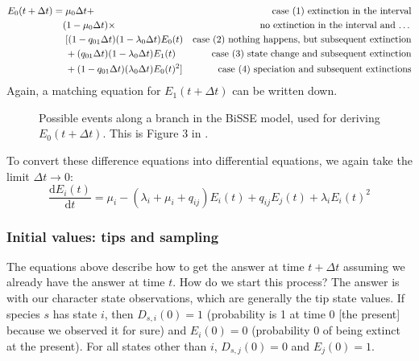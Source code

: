 \begin{align*}
    E_0(t + \Delta t) = &\; \mu_0\Delta t + 
	                 & \text{case (1) extinction in the interval} \\
				     & (1 - \mu_0\Delta t) \times & \text{no extinction in the interval and \dots} \\
				     & \;[(1-q_{01}\Delta t)(1-\lambda_0 \Delta t) E_0(t) & \text{case (2) nothing happens, but subsequent extinction} \\
                     & \;+ (q_{01}\Delta t) (1-\lambda_0 \Delta t) E_1(t) & \text{case (3) state change and subsequent extinction} \\
                     & \;+ (1 - q_{01} \Delta t) (\lambda_0 \Delta t) E_0(t)^2] & \text{case (4) speciation and subsequent extinctions}
\end{align*}
Again, a matching equation for $E_1(t+\Delta t)$ can be written down.

\begin{figure}
\centering
{}
\caption{\small
    Possible events along a branch in the BiSSE model, used for deriving $E_0(t + \Delta t)$.
    This is Figure 3 in \citet{Maddison2007}.
}
\label{fig:BiSSE_Events_E}
\end{figure}

To convert these difference equations into differential equations, we again take the limit $\Delta t \rightarrow 0$:
\begin{equation}
    \frac{\mathrm{d}E_i(t)}{\mathrm{d}t} = \mu_i - \left(\lambda_i + \mu_i + q_{ij} \right)E_i(t) + q_{ij} E_j(t) + \lambda_i E_i(t)^2
    \label{eq:BiSSE_E}
\end{equation}

\subsubsection{Initial values: tips and sampling}

The equations above describe how to get the answer at time $t + \Delta t$ assuming we already have the answer at time $t$.
How do we start this process?
The answer is with our character state observations, which are generally the tip state values.
If species $s$ has state $i$, then $D_{s,i}(0) = 1$ (probability is 1 at time 0 [the present] because we observed it for sure) and $E_i(0) = 0$ (probability 0 of being extinct at the present).
For all states other than $i$, $D_{s,j}(0) = 0$ and $E_j(0) = 1$.


